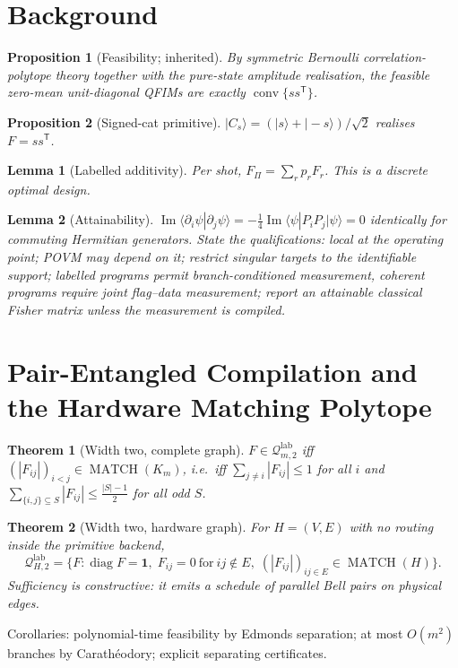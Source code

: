 \documentclass[11pt]{article}
\newtheorem{theorem}{Theorem}
\newtheorem{proposition}{Proposition}
\newtheorem{lemma}{Lemma}
\begin{document}
\section{Background}
\begin{proposition}[Feasibility; inherited]
By symmetric Bernoulli correlation-polytope theory together with the pure-state amplitude
realisation, the feasible zero-mean unit-diagonal QFIMs are exactly
$\operatorname{conv}\{ss^{\mathsf T}\}$.
\end{proposition}
\begin{proposition}[Signed-cat primitive]
$|C_s\rangle=(|s\rangle+|-s\rangle)/\sqrt2$ realises $F=ss^{\mathsf T}$.
\end{proposition}
\begin{lemma}[Labelled additivity]
Per shot, $F_\Pi=\sum_rp_rF_r$. This is a discrete optimal design.
\end{lemma}
\begin{lemma}[Attainability]
$\operatorname{Im}\langle\partial_i\psi|\partial_j\psi\rangle
=-\tfrac14\operatorname{Im}\langle\psi|P_iP_j|\psi\rangle=0$ identically for commuting
Hermitian generators. State the qualifications: local at the operating point; POVM may depend
on it; restrict singular targets to the identifiable support; labelled programs permit
branch-conditioned measurement, coherent programs require joint flag--data measurement;
report an attainable classical Fisher matrix unless the measurement is compiled.
\end{lemma}

\section{Pair-Entangled Compilation and the Hardware Matching Polytope}
\begin{theorem}[Width two, complete graph]
$F\in\mathcal Q^{\mathrm{lab}}_{m,2}$ iff
$(|F_{ij}|)_{i<j}\in\operatorname{MATCH}(K_m)$, i.e.\ iff
$\sum_{j\neq i}|F_{ij}|\le1$ for all $i$ and
$\sum_{\{i,j\}\subseteq S}|F_{ij}|\le\frac{|S|-1}2$ for all odd $S$.
\end{theorem}
\begin{theorem}[Width two, hardware graph]
For $H=(V,E)$ with no routing inside the primitive backend,
\[
\mathcal Q^{\mathrm{lab}}_{H,2}
=\Big\{F:\operatorname{diag}F=\bm1,\;F_{ij}=0\ \text{for}\ ij\notin E,\;
(|F_{ij}|)_{ij\in E}\in\operatorname{MATCH}(H)\Big\}.
\]
Sufficiency is constructive: it emits a schedule of parallel Bell pairs on physical edges.
\end{theorem}
Corollaries: polynomial-time feasibility by Edmonds separation; at most $O(m^2)$ branches by
Carath\'eodory; explicit separating certificates.
\end{document}
